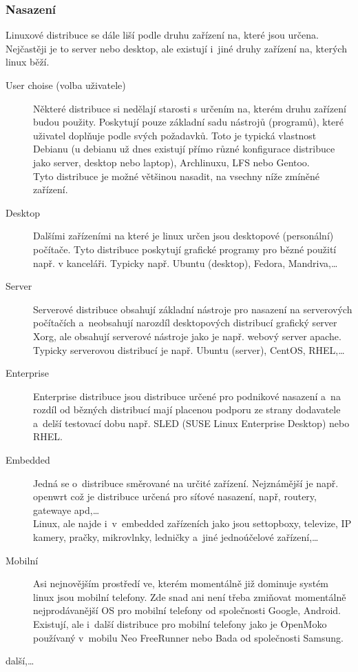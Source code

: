 \documentclass[a4paper,12pt]{article}
\begin{document}
\subsubsection{Nasazení}
Linuxové distribuce se dále liší podle druhu zařízení na, které jsou určena. Nejčastěji je to server nebo desktop, ale existují i~jiné druhy zařízení na, kterých linux běží.
\begin{description}
 \item[User choise (volba uživatele)] Některé distribuce si nedělají starosti s určením na, kterém druhu zařízení budou použity. Poskytují pouze základní sadu nástrojů (programů), které uživatel doplňuje podle svých požadavků. Toto je typická vlastnost Debianu (u debianu už dnes existují přímo různé konfigurace distribuce jako server, desktop nebo laptop), Archlinuxu, LFS nebo Gentoo.\\
Tyto distribuce je možné většinou nasadit, na vsechny níže zmíněné zařízení.
 \item[Desktop] Dalšími zařízeními na které je linux určen jsou desktopové (personální) počítače. Tyto distribuce poskytují grafické programy pro bězné použití např. v kanceláři. Typicky např. Ubuntu (desktop), Fedora, Mandriva,…
 \item[Server] Serverové distribuce obsahují základní nástroje pro nasazení na serverových počítačích a~neobsahují narozdíl desktopových distribucí grafický server Xorg, ale obsahují serverové nástroje jako je např. webový server apache. Typicky serverovou distribucí je např. Ubuntu (server), CentOS, RHEL,…
 \item[Enterprise] Enterprise distribuce jsou distribuce určené pro podnikové nasazení a~na rozdíl od bězných distribucí mají placenou podporu ze strany dodavatele a~delší testovací dobu např. SLED (SUSE Linux Enterprise Desktop) nebo RHEL.
 \item[Embedded] Jedná se o~distribuce směrované na určité zařízení. Nejznámější je např. openwrt což je distribuce určená pro síťové nasazení, např, routery, gatewaye apd,…\\
Linux, ale najde i~v~embedded zařízeních jako jsou settopboxy, televize, IP kamery, pračky, mikrovlnky, ledničky a~jiné jednoúčelové zařízení,…
 \item[Mobilní] Asi nejnovějším prostředí ve, kterém momentálně již dominuje systém linux jsou mobilní telefony. Zde snad ani není třeba zmiňovat momentálně nejprodávanější OS pro mobilní telefony od společnosti Google, Android. Existují, ale i~další distribuce pro mobilní telefony jako je OpenMoko používaný v~mobilu Neo FreeRunner nebo Bada od společnosti Samsung.
 \item[další,…] 
 \end{description}
\end{document}
